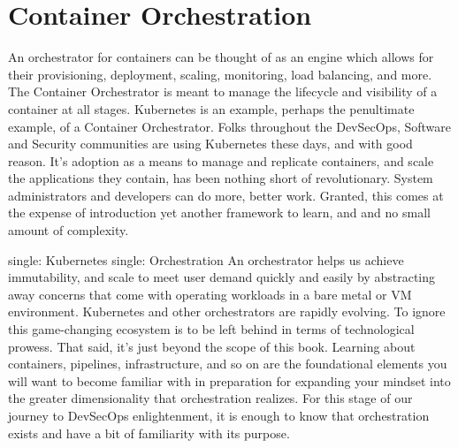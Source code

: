 \section{Container Orchestration}
\justify
An orchestrator for containers can be thought of as an engine which
allows for their provisioning, deployment, scaling, monitoring, load
balancing, and more. The Container Orchestrator is meant to manage the
lifecycle and visibility of a container at all stages.
\justify
Kubernetes is an example, perhaps the penultimate example, of a
Container Orchestrator. Folks throughout the DevSecOps, Software and
Security communities are using Kubernetes these days, and with good
reason. It's adoption as a means to manage and replicate containers, and
scale the applications they contain, has been nothing short of
revolutionary. System administrators and developers can do more, better
work. Granted, this comes at the expense of introduction yet another
framework to learn, and and no small amount of complexity.

single: Kubernetes single: Orchestration
\justify
An orchestrator helps us achieve immutability, and scale to meet user demand quickly and easily by abstracting away concerns that come with operating workloads in a bare metal or VM environment.
\justify
Kubernetes and other orchestrators are rapidly evolving. To ignore this game-changing ecosystem is to be left behind in terms of technological prowess. That said, it's just beyond the scope of this book. Learning about containers, pipelines, infrastructure, and so on are the foundational elements you will want to become familiar with in preparation for expanding your mindset into the greater dimensionality that orchestration realizes.
\justify
For this stage of our journey to DevSecOps enlightenment, it is enough to know that orchestration exists and have a bit of familiarity with its purpose.